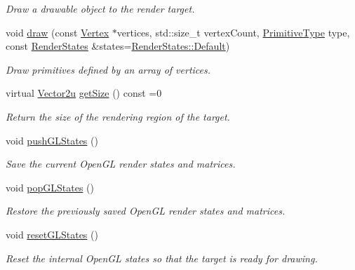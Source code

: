 \begin{DoxyCompactItemize}
\begin{DoxyCompactList}\small\item\em Draw a drawable object to the render target. \end{DoxyCompactList}\item 
void \hyperlink{classsf_1_1RenderTarget_a976bc94057799eb9f8a18ac5fdfd9b73}{draw} (const \hyperlink{classsf_1_1Vertex}{Vertex} $\ast$vertices, std\+::size\+\_\+t vertex\+Count, \hyperlink{group__graphics_ga5ee56ac1339984909610713096283b1b}{Primitive\+Type} type, const \hyperlink{classsf_1_1RenderStates}{Render\+States} \&states=\hyperlink{classsf_1_1RenderStates_ad29672df29f19ce50c3021d95f2bb062}{Render\+States\+::\+Default})
\begin{DoxyCompactList}\small\item\em Draw primitives defined by an array of vertices. \end{DoxyCompactList}\item 
virtual \hyperlink{classsf_1_1Vector2}{Vector2u} \hyperlink{classsf_1_1RenderTarget_a2e5ade2457d9fb4c4907ae5b3d9e94a5}{get\+Size} () const =0
\begin{DoxyCompactList}\small\item\em Return the size of the rendering region of the target. \end{DoxyCompactList}\item 
void \hyperlink{classsf_1_1RenderTarget_a8d1998464ccc54e789aaf990242b47f7}{push\+G\+L\+States} ()
\begin{DoxyCompactList}\small\item\em Save the current Open\+GL render states and matrices. \end{DoxyCompactList}\item 
void \hyperlink{classsf_1_1RenderTarget_ad5a98401113df931ddcd54c080f7aa8e}{pop\+G\+L\+States} ()
\begin{DoxyCompactList}\small\item\em Restore the previously saved Open\+GL render states and matrices. \end{DoxyCompactList}\item 
void \hyperlink{classsf_1_1RenderTarget_aac7504990d27dada4bfe3c7866920765}{reset\+G\+L\+States} ()
\begin{DoxyCompactList}\small\item\em Reset the internal Open\+GL states so that the target is ready for drawing. \end{DoxyCompactList}\end{DoxyCompactItemize}
